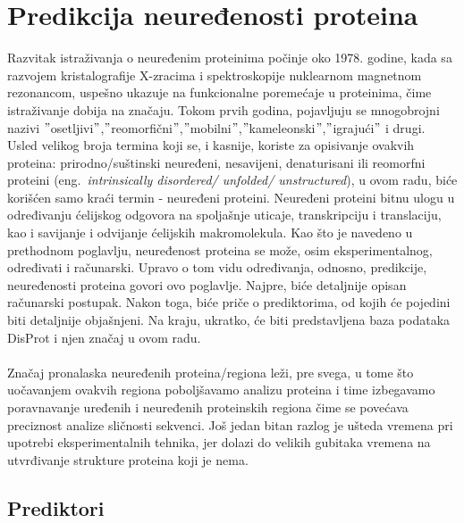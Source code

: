 
\chapter{Predikcija neuređenosti proteina} %
\label{predikcija} %

Razvitak istraživanja o neuređenim proteinima počinje oko 1978. godine, kada sa razvojem kristalografije X-zracima i spektroskopije nuklearnom magnetnom rezonancom, uspešno ukazuje na funkcionalne poremećaje u proteinima, čime istraživanje dobija na značaju. Tokom prvih godina, pojavljuju se mnogobrojni nazivi $"$osetljivi$"$,$"$reomorfični$"$,$"$mobilni$"$,$"$kameleonski$"$,$"$igrajući$"$ i drugi. Usled velikog broja termina koji se, i kasnije, koriste za opisivanje ovakvih proteina: prirodno/suštinski neuređeni, nesavijeni, denaturisani ili reomorfni proteini (eng.~{\em intrinsically disordered/ unfolded/ unstructured}), u ovom radu, biće korišćen samo kraći termin - neuređeni proteini. 
Neuređeni proteini bitnu ulogu u određivanju ćelijskog odgovora na spoljašnje uticaje, transkripciju i translaciju, kao i savijanje i odvijanje ćelijskih makromolekula.
Kao što je navedeno u prethodnom poglavlju, neuređenost proteina se može, osim eksperimentalnog, određivati i računarski. Upravo o tom vidu određivanja, odnosno, predikcije, neuređenosti proteina govori ovo poglavlje. Najpre, biće detaljnije opisan računarski postupak. Nakon toga, biće priče o prediktorima, od kojih će pojedini biti detaljnije objašnjeni. Na kraju, ukratko, će biti predstavljena baza podataka DisProt i njen značaj u ovom radu.~\cite{IDPsAtoZ,JKd, IDPTompa}\\\\
Značaj pronalaska neuređenih proteina/regiona leži, pre svega, u tome što uočavanjem ovakvih regiona poboljšavamo analizu proteina i time izbegavamo poravnavanje uređenih i neuređenih proteinskih regiona čime se povećava preciznost analize sličnosti sekvenci. Još jedan bitan razlog je ušteda vremena pri upotrebi eksperimentalnih tehnika, jer dolazi do velikih gubitaka vremena na utvrđivanje strukture proteina koji je nema.~\cite{POverview, COverview} 


\section{Prediktori}


